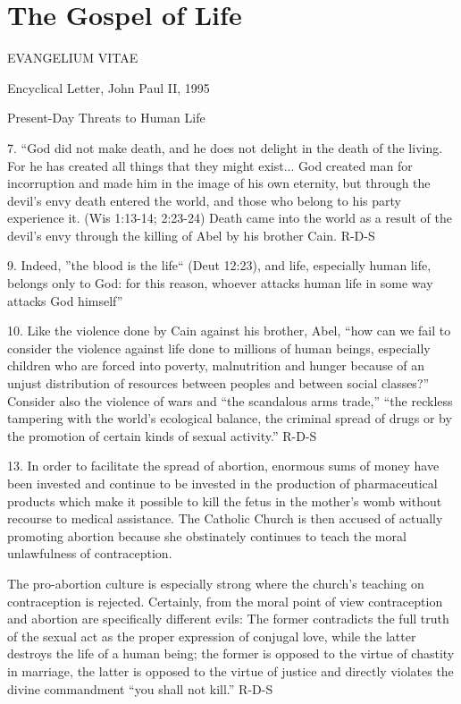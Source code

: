 \documentclass[oneside]{book}
\begin{document}

\chapter{The Gospel of Life}

EVANGELIUM VITAE

Encyclical Letter, John Paul II, 1995


Present-Day Threats to Human Life

7. ``God did not make death, and he does not delight in the death of the
living. For he has created all things that they might exist... God created man
for incorruption and made him in the image of his own eternity, but through the
devil's envy death entered the world, and those who belong to his party
experience it. (Wis 1:13-14; 2:23-24) Death came into the world as a result of
the devil's envy through the killing of Abel by his brother Cain.
R-D-S

9. Indeed, ''the blood is the life`` (Deut 12:23), and life, especially human
life, belongs only to God: for this reason, whoever attacks human life in some
way attacks God himself''

10. Like the violence done by Cain against his brother, Abel, ``how can we fail
to consider the violence against life done to millions of human beings,
especially children who are forced into poverty, malnutrition and hunger because
of an unjust distribution of resources between peoples and between social
classes?'' Consider also the violence of wars and ``the scandalous arms trade,''
``the reckless tampering with the world's ecological balance, the criminal
spread of drugs or by the promotion of certain kinds of sexual activity.''
R-D-S

13.  In order to facilitate the spread of abortion, enormous sums of money have
been invested and continue to be invested in the production of pharmaceutical
products which make it possible to kill the fetus in the mother's womb without
recourse to medical assistance.
The Catholic Church is then accused of actually promoting abortion because she
obstinately continues to teach the moral unlawfulness of contraception.

The pro-abortion culture is especially strong where the church's teaching on
contraception is rejected. Certainly, from the moral point of view contraception
and abortion are specifically different evils: The former contradicts the full
truth of the sexual act as the proper expression of conjugal love, while the
latter destroys the life of a human being; the former is opposed to the virtue
of chastity in marriage, the latter is opposed to the virtue of justice and
directly violates the divine commandment ``you shall not kill.''
R-D-S
\end{document}
